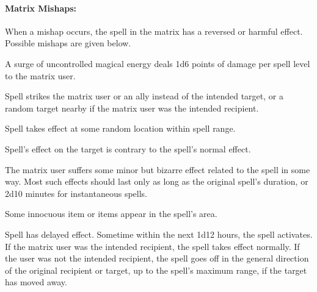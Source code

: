 \paragraph{Matrix Mishaps:} When a mishap occurs, the spell in the matrix has a reversed or harmful effect. Possible mishaps are given below.
\begin{list}{}{\leftmargin=1em}
 \item A surge of uncontrolled magical energy deals 1d6 points of damage per spell level to the matrix user.
 \item Spell strikes the matrix user or an ally instead of the intended target, or a random target nearby if the matrix user was the intended recipient.
 \item Spell takes effect at some random location within spell range.
 \item Spell's effect on the target is contrary to the spell's normal effect.
 \item The matrix user suffers some minor but bizarre effect related to the spell in some way. Most such effects should last only as long as the original spell's duration, or 2d10 minutes for instantaneous spells.
 \item Some innocuous item or items appear in the spell's area.
 \item Spell has delayed effect. Sometime within the next 1d12 hours, the spell activates. If the matrix user was the intended recipient, the spell takes effect normally. If the user was not the intended recipient, the spell goes off in the general direction of the original recipient or target, up to the spell's maximum range, if the target has moved away.
\end{list}


